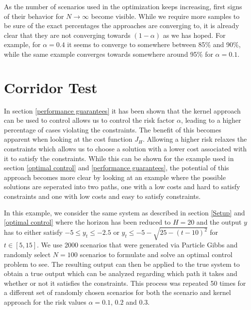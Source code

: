 As the number of scenarios used in the optimization keeps increasing, first signs of their behavior for $N \to \infty$ become visible. While we require more samples to be sure of the exact percentages the approaches are converging to, it is already clear that they are not converging towards $(1 - \alpha)$ as we has hoped. For example, for $\alpha = 0.4$ it seems to converge to somewhere between 85\% and 90\%, while the same example converges towards somewhere around 95\% for $\alpha = 0.1$.
 
\section{Corridor Test} \label{corridor}

In section \ref{performance guarantees} it has been shown that the kernel approach can be used to control allows us to control the risk factor $\alpha$, leading to a higher percentage of cases violating the constraints. The benefit of this becomes apparent when looking at the cost function $J_H$. Allowing a higher risk relaxes the constraints which allows us to choose a solution with a lower cost associated with it to satisfy the constraints. While this can be shown for the example used in section \ref{optimal control} and \ref{performance guarantees}, the potential of this approach becomes more clear by looking at an example where the possible solutions are seperated into two paths, one with a low costs and hard to satisfy constraints and one with low costs and easy to satisfy constraints.

In this example, we consider the same system as described in section \ref{Setup} and \ref{optimal control} where the horizon has been reduced to $H = 20$ and the output $y$ has to either satisfy $-5 \leq y_t \leq -2.5$ or $y_t \leq -5 - \sqrt{25- (t - 10)^2}$ for $t \in [5, 15]$. We use 2000 scenarios that were generated via Particle Gibbs and randomly select $N = 100$ scenarios to formulate and solve an optimal control problem to see. The resulting output can then be applied to the true system to obtain a true output which can be analyzed regarding which path it takes and whether or not it satisfies the constraints. This process was repeated 50 times for a different set of randomly chosen scenarios for both the scenario and kernel approach for the risk values $\alpha = 0.1$, $0.2$ and $0.3$.



